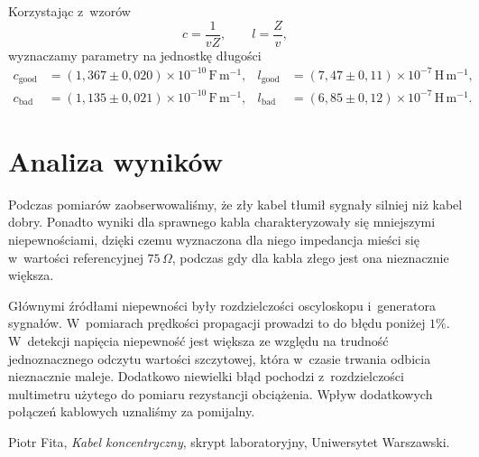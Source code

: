 \documentclass[12pt]{article}
\begin{document}
Korzystając z~wzorów \cite{skrypt}
\[
  c=\frac{1}{v Z},\qquad l=\frac{Z}{v},
\]
wyznaczamy parametry na jednostkę długości
\begin{align*}
  c_{\mathrm{good}} &= (1{,}367\pm0{,}020)\times10^{-10}\,\mathrm{F\,m^{-1}}, &
  l_{\mathrm{good}} &= (7{,}47\pm0{,}11)\times10^{-7}\,\mathrm{H\,m^{-1}},\\
  c_{\mathrm{bad}}  &= (1{,}135\pm0{,}021)\times10^{-10}\,\mathrm{F\,m^{-1}}, &
  l_{\mathrm{bad}}  &= (6{,}85\pm0{,}12)\times10^{-7}\,\mathrm{H\,m^{-1}}.
\end{align*}

\section{Analiza wyników}
Podczas pomiarów zaobserwowaliśmy, że zły kabel tłumił sygnały silniej niż kabel dobry. Ponadto wyniki dla sprawnego kabla charakteryzowały się mniejszymi niepewnościami, dzięki czemu wyznaczona dla niego impedancja mieści się w~wartości referencyjnej \(75\,\Omega\), podczas gdy dla kabla złego jest ona nieznacznie większa.

Głównymi źródłami niepewności były rozdzielczości oscyloskopu i~generatora sygnałów. W~pomiarach prędkości propagacji prowadzi to do błędu poniżej \(1\%\). W~detekcji napięcia niepewność jest większa ze względu na trudność jednoznacznego odczytu wartości szczytowej, która w~czasie trwania odbicia nieznacznie maleje. Dodatkowo niewielki błąd pochodzi z~rozdzielczości multimetru użytego do pomiaru rezystancji obciążenia. Wpływ dodatkowych połączeń kablowych uznaliśmy za pomijalny.

\vspace{1 in}

\begin{thebibliography}{1}

Piotr Fita, \emph{Kabel koncentryczny}, skrypt laboratoryjny, Uniwersytet Warszawski.

\end{thebibliography}
\end{document}
